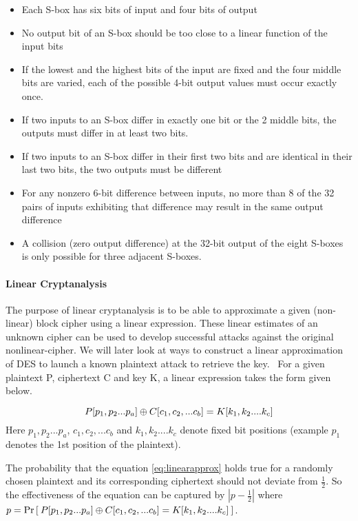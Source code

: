 \begin{itemize}
\item Each S-box has six bits of input and four bits of output
\item No output bit of an S-box should be too close to a linear function of the input bits
\item If the lowest and the highest bits of the input are fixed and the four middle bits are varied, each of the possible 4-bit output values must occur exactly once.
\item If two inputs to an S-box differ in exactly one bit or the 2 middle bits, the outputs must differ in at least two bits. 
\item If two inputs to an S-box differ in their first two bits and are identical in their last two bits, the two outputs must be different
\item For any nonzero 6-bit difference between inputs, no more than 8 of the 32 pairs of inputs exhibiting that difference may result in the same output difference
\item A collision (zero output difference) at the 32-bit output of the eight S-boxes is only possible for three adjacent S-boxes.
\end{itemize}

\paragraph{Linear Cryptanalysis} The purpose of linear cryptanalysis is to be able to approximate a given (non-linear) block cipher using a linear expression. These linear estimates of an unknown cipher can be used to develop successful attacks against the original nonlinear-cipher. We will later look at ways to construct a linear approximation of DES to launch a known plaintext attack to retrieve the key. \
For a given plaintext P, ciphertext C and key K, a linear expression takes the form given below.

\begin{equation}
 P[p_1, p_2 ... p_a] {\:\oplus\:} C[c_1, c_2, ... c_b] = K[k_1, k_2 .... k_c] \label{eq:linearapprox}
\end{equation}
Here $p_1, p_2 ... p_a$, $c_1, c_2, ... c_b$ and $k_1, k_2 .... k_c$ denote fixed bit positions (example $p_1$ denotes the 1st position of the plaintext). \newline

The probability that the equation \eqref{eq:linearapprox} holds true for a randomly chosen plaintext and its corresponding ciphertext should not deviate from $\frac{1}{2}$. So the effectiveness of the equation can be captured by \( |p - \frac{1}{2}|\) where \( p = \Pr\left[\: P[p_1, p_2 ... p_a] {\:\oplus\:} C[c_1, c_2, ... c_b] = K[k_1, k_2 .... k_c] \:\right]\). \newline

